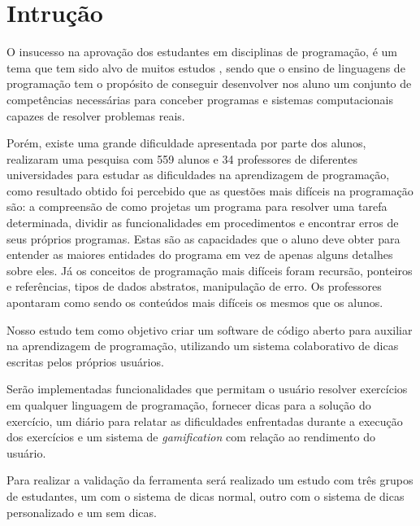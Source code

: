 \chapter{Intrução}

O insucesso na aprovação dos estudantes em disciplinas de programação, é um tema que tem sido alvo de muitos estudos \cite{bosse2015reprovaccoes}, sendo que o ensino de linguagens de programação tem o propósito de conseguir desenvolver nos aluno um conjunto de competências necessárias para conceber programas e sistemas computacionais capazes de resolver problemas reais. 

Porém, existe uma grande dificuldade apresentada por parte dos alunos, \cite{lahtinen2005study} realizaram uma pesquisa com 559 alunos e 34 professores de diferentes universidades para estudar as dificuldades na aprendizagem de programação, como resultado obtido foi percebido que as questões mais difíceis na programação são: a compreensão de como projetas um programa para resolver uma tarefa determinada, dividir as funcionalidades em procedimentos e encontrar erros de seus próprios programas. Estas são as capacidades que o aluno deve obter para entender as maiores entidades do programa em vez de apenas alguns detalhes sobre eles. Já os conceitos de programação mais difíceis foram recursão, ponteiros e referências, tipos de dados abstratos, manipulação de erro. Os professores apontaram como sendo os conteúdos mais difíceis os mesmos que os alunos.

Nosso estudo tem como objetivo criar um software de código aberto para auxiliar na aprendizagem de programação, utilizando um sistema colaborativo de dicas escritas pelos próprios usuários. 

Serão implementadas funcionalidades que permitam o usuário resolver exercícios em qualquer linguagem de programação, fornecer dicas para a solução do exercício, um diário para relatar as dificuldades enfrentadas durante a execução dos exercícios e um sistema de \textit{gamification} com relação ao rendimento do usuário.

Para realizar a validação da ferramenta será realizado um estudo com três grupos de estudantes, um com o sistema de dicas normal, outro com o sistema de dicas personalizado e um sem dicas.




